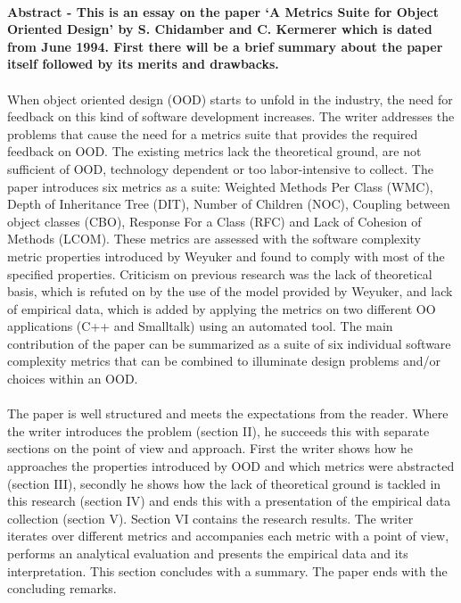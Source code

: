 \paragraph{}
\textbf{
Abstract - This is an essay on the paper `A Metrics Suite for Object Oriented Design' by S. Chidamber and C.
Kermerer which is dated from June 1994. First there will be a brief summary about the paper itself followed by
its merits and drawbacks.
}

\paragraph{}
When object oriented design (OOD) starts to unfold in the industry, the need for feedback on this kind of software
development increases. The writer addresses the problems that cause the need for a metrics suite that provides the
required feedback on OOD. The existing metrics lack the theoretical ground, are not sufficient of OOD,
technology dependent or too labor-intensive to collect.
The paper introduces six metrics as a suite: Weighted Methods Per Class (WMC), Depth of Inheritance Tree (DIT),
Number of Children (NOC), Coupling between object classes (CBO), Response For a Class (RFC) and Lack of
Cohesion of Methods (LCOM). These metrics are assessed with the software complexity metric properties introduced by
Weyuker \autocite{WEYUKER} and found to comply with most of the specified properties.
Criticism on previous research was the lack of theoretical basis, which is refuted on by the use of the
model provided by Weyuker, and lack of empirical data, which is added by applying the metrics on two different OO
applications (C++ and Smalltalk) using an automated tool. The main contribution of the paper can be summarized as a
suite of six individual software complexity metrics that can be combined to illuminate design problems and/or choices
within an OOD.

\paragraph{}
The paper is well structured and meets the expectations from the reader. Where the writer introduces the problem
(section II), he succeeds this with separate sections on the point of view and approach. First the writer shows how he
approaches the properties introduced by OOD and which metrics were abstracted (section III), secondly he shows how the
lack of theoretical ground is tackled in this research (section IV) and ends this with a presentation of the empirical
data collection (section V). Section VI contains the research results. The writer iterates over different metrics and
accompanies each metric with a point of view, performs an analytical evaluation and presents the empirical data and its
interpretation. This section concludes with a summary. The paper ends with the concluding remarks.

